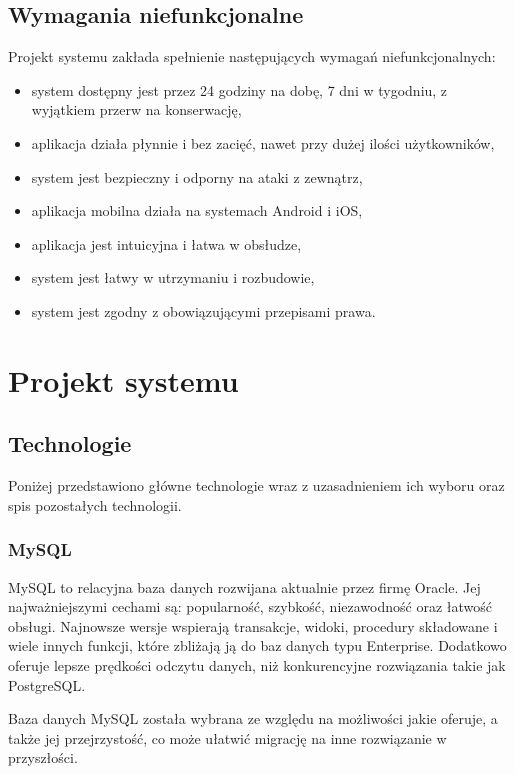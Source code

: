 \subsection{Wymagania niefunkcjonalne}

Projekt systemu zakłada spełnienie następujących wymagań niefunkcjonalnych:

\begin{itemize}
    \item system dostępny jest przez 24 godziny na dobę, 7 dni w tygodniu, z wyjątkiem przerw na konserwację,
    \item aplikacja działa płynnie i bez zacięć, nawet przy dużej ilości użytkowników,
    \item system jest bezpieczny i odporny na ataki z zewnątrz,
    \item aplikacja mobilna działa na systemach Android i iOS,
    \item aplikacja jest intuicyjna i łatwa w obsłudze,
    \item system jest łatwy w utrzymaniu i rozbudowie,
    \item system jest zgodny z obowiązującymi przepisami prawa.
\end{itemize}

\section{Projekt systemu}

\subsection{Technologie}

Poniżej przedstawiono główne technologie wraz z uzasadnieniem ich wyboru oraz spis pozostałych technologii.

\subsubsection*{MySQL}

MySQL to relacyjna baza danych rozwijana aktualnie przez firmę Oracle. Jej najważniejszymi cechami są: popularność, szybkość, niezawodność oraz łatwość obsługi. Najnowsze wersje wspierają transakcje, widoki, procedury składowane i wiele innych funkcji, które zbliżają ją do baz danych typu Enterprise. Dodatkowo oferuje lepsze prędkości odczytu danych, niż konkurencyjne rozwiązania takie jak PostgreSQL. \cite{bib:mysql}

Baza danych MySQL została wybrana ze względu na możliwości jakie oferuje, a także jej przejrzystość, co może ułatwić migrację na inne rozwiązanie w przyszłości.


